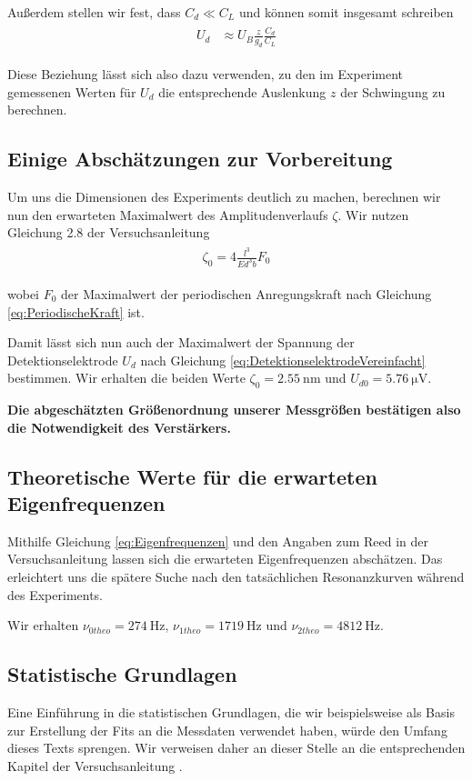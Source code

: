 Außerdem stellen wir fest, dass $C_d \ll C_L$ und können somit insgesamt schreiben
\begin{align}
    \label{eq:DetektionselektrodeVereinfacht}
    \begin{split}
        U_d &\approx U_B \frac{z}{g_d} \frac{C_d}{C_L}
    \end{split}
\end{align}

Diese Beziehung lässt sich also dazu verwenden, zu den im Experiment gemessenen Werten für $U_d$ die entsprechende Auslenkung $z$ der Schwingung zu berechnen.

\subsection{Einige Abschätzungen zur Vorbereitung}

Um uns die Dimensionen des Experiments deutlich zu machen, berechnen wir nun den erwarteten Maximalwert des Amplitudenverlaufs $\zeta$.
Wir nutzen Gleichung 2.8 der Versuchsanleitung
\begin{align}
    \label{eq:MaximaleAmplitude}
    \begin{split}
        \zeta_0 = 4 \frac{l^3}{Ed^3b} F_0
    \end{split}
\end{align}

wobei $F_0$ der Maximalwert der periodischen Anregungskraft nach Gleichung \ref{eq:PeriodischeKraft} ist.

Damit lässt sich nun auch der Maximalwert der Spannung der Detektionselektrode $U_d$ nach Gleichung \ref{eq:DetektionselektrodeVereinfacht} bestimmen.
Wir erhalten die beiden Werte $\zeta_0 = \SI{2.55}{\nano\meter}$ und $U_{d0} = \SI{5.76}{\micro\volt}$.

\textbf{Die abgeschätzten Größenordnung unserer Messgrößen bestätigen also die Notwendigkeit des Verstärkers.}

\subsection{Theoretische Werte für die erwarteten Eigenfrequenzen}

Mithilfe Gleichung \ref{eq:Eigenfrequenzen} und den Angaben zum Reed in der Versuchsanleitung \cite{Anleitung} lassen sich die erwarteten Eigenfrequenzen abschätzen.
Das erleichtert uns die spätere Suche nach den tatsächlichen Resonanzkurven während des Experiments.

Wir erhalten $\nu_{0 theo} = \SI{274}{\hertz}$, $\nu_{1 theo} = \SI{1719}{\hertz}$ und $\nu_{2 theo} = \SI{4812}{\hertz}$.
\label{eq:AbschaetzungEigenfrequenzen}

\subsection{Statistische Grundlagen}

Eine Einführung in die statistischen Grundlagen, die wir beispielsweise als Basis zur Erstellung der Fits an die Messdaten verwendet haben, würde den Umfang dieses Texts sprengen.
Wir verweisen daher an dieser Stelle an die entsprechenden Kapitel der Versuchsanleitung \cite{Anleitung}.
